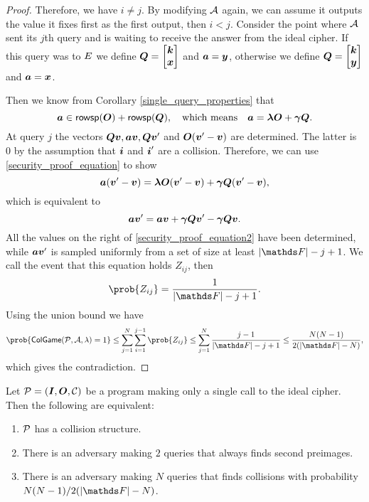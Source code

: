 \begin{proof}
    Therefore, we have $i \neq j$.
    By modifying $\A$ again,
    we can assume it outputs the value it fixes first as the first output, then $i < j$.
    Consider the point where $\A$ sent its $j$th query and is waiting to receive the answer from the ideal cipher.
    If this query was to $\E$ we define $\Q = \m{\vk \\ \vx}$ and $\va = \vy$,
    otherwise we define $\Q = \m{\vk \\ \vy}$ and $\va = \vx$.
    
    Then we know from Corollary \ref{single_query_properties} that
    \begin{equation}
    \label{security_proof_equation}
    \va \in \rowsp(\O) + \rowsp(\Q) ,\quad \textrm{which means} \quad \va = \v \lambda \O + \v \gamma \Q.
    \end{equation}
    At query $j$ the vectors $\Q\vv, \va\vv, \Q\vv'$ and $\O(\vv' - \vv)$ are determined.
    The latter is $0$ by the assumption that $\v i$ and $\v i'$ are a collision.
    Therefore, we can use \eqref{security_proof_equation} to show
    \begin{equation*}
    \va (\vv' - \vv) = \v\lambda\O(\vv' - \vv) + \v\gamma \Q (\vv' - \vv),
    \end{equation*}
    which is equivalent to
    \begin{equation}
    \label{security_proof_equation2}
    \va \vv' = \va\vv + \v\gamma \Q \vv' - \v\gamma \Q\vv.
    \end{equation}
    All the values on the right of \eqref{security_proof_equation2} have been determined,
    while $\va\vv'$ is sampled uniformly from a set of size at least $|\F| - j + 1$.
    We call the event that this equation holds $Z_{ij}$, then
    \[
        \prob{Z_{ij}} = \frac{1}{|\F| - j + 1}.
    \]
    Using the union bound we have
    \begin{equation*}
    \prob{\mathsf{ColGame}(\P,\A,\lambda) = 1}
    \leq \sum_{j=1}^N \sum_{i=1}^{j-1} \prob{Z_{ij}}
    \leq \sum_{j=1}^N \frac{j - 1}{|\F| - j + 1}
    \leq \frac{N(N-1)}{2(|\F| - N)},
    \end{equation*}
    which gives the contradiction.
\end{proof}

\begin{corollary}
\label{corollary_single_query_cr_resistance}
    Let $\P = (\I, \O, \C)$ be a program making only a single call to the ideal cipher.
    Then the following are equivalent:
    \begin{enumerate}
    \item $\P$ has a collision structure.
    \item There is an adversary making $2$ queries that always finds second preimages.
    \item There is an adversary making $N$ queries that finds collisions with probability $N(N-1) / 2(|\F| - N)$.
    \end{enumerate}
\end{corollary}

